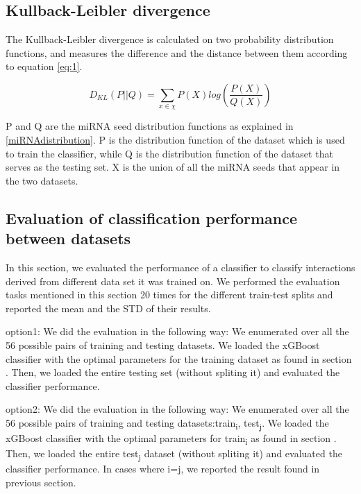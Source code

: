 \documentclass{bmcart}
\begin{document}
\subsection*{Kullback-Leibler divergence}
The Kullback-Leibler divergence is calculated on two probability distribution functions, and measures the difference and the distance between them according to equation \ref{eq:1}.

\begin{equation}
 D_{KL} \left (P ||Q \right ) = \sum_{x\in \chi }{P\left ( X \right )log\left ( \frac{P\left ( X \right )}{Q\left ( X \right )} \right )}\label{eq:1}
\end{equation}

P and Q are the miRNA seed distribution functions as explained in \ref{miRNAdistribution}. P is the distribution function of the dataset which is used to train the classifier, while Q is the distribution function of the dataset that serves as the testing set. X is the union of all the miRNA seeds that appear in the two datasets.

\subsection*{Evaluation of classification performance between datasets}
In this section, we evaluated the performance of a classifier to classify interactions derived from different data set it was trained on. We performed the evaluation tasks mentioned in this section 20 times for the different train-test splits and reported the mean and the STD of their results. 

option1: We did the evaluation in the following way: We enumerated over all the 56 possible pairs of training and testing datasets. We loaded the xGBoost classifier with the optimal parameters for the training dataset as found in section . Then, we loaded the entire testing set (without spliting it) and evaluated the classifier performance. 

option2: We did the evaluation in the following way: We enumerated over all the 56 possible pairs of training and testing datasets:train\textsubscript{i}, test\textsubscript{j}. We loaded the xGBoost classifier with the optimal parameters for train\textsubscript{i} as found in section . Then, we loaded the entire test\textsubscript{j} dataset (without spliting it) and evaluated the classifier performance. In cases where i=j,  we reported the result found in previous section.
\end{document}
